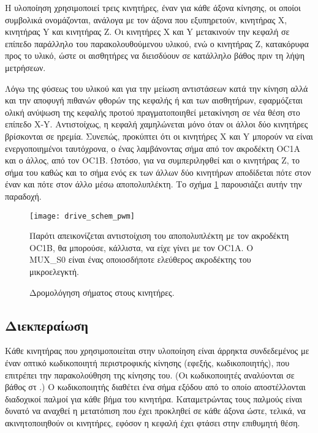 Η υλοποίηση χρησιμοποιεί τρεις κινητήρες, έναν για κάθε άξονα κίνησης, οι οποίοι
συμβολικά ονομάζονται, ανάλογα με τον άξονα που εξυπηρετούν, κινητήρας X,
κινητήρας Y και κινητήρας Z. Οι κινητήρες X και Y μετακινούν την κεφαλή σε
επίπεδο παράλληλο του παρακολουθούμενου υλικού, ενώ ο κινητήρας Z, κατακόρυφα
προς το υλικό, ώστε οι αισθητήρες να διεισδύουν σε κατάλληλο βάθος πριν τη λήψη
μετρήσεων.

Λόγω της φύσεως του υλικού και για την μείωση αντιστάσεων κατά την κίνηση αλλά
και την αποφυγή πιθανών φθορών της κεφαλής ή και των αισθητήρων, εφαρμόζεται
ολική ανύψωση της κεφαλής προτού πραγματοποιηθεί μετακίνηση σε νέα θέση στο
επίπεδο X-Y. Αντιστοίχως, η κεφαλή χαμηλώνεται μόνο όταν οι άλλοι δύο κινητήρες
βρίσκονται σε ηρεμία. Συνεπώς, προκύπτει ότι οι κινητήρες X και Y μπορούν να
είναι ενεργοποιημένοι ταυτόχρονα, ο ένας λαμβάνοντας σήμα από τον ακροδέκτη OC1A
και ο άλλος, από τον OC1B. Ωστόσο, για να συμπεριληφθεί και ο κινητήρας Z, το
σήμα του καθώς και το σήμα ενός εκ των άλλων δύο κινητήρων αποδίδεται πότε στον
έναν και πότε στον άλλο μέσω αποπολυπλέκτη. Το σχήμα
\ref{fig:motor:route_pwm} παρουσιάζει αυτήν την παραδοχή.

\begin{figure}
    \caption{Δρομολόγηση σήματος στους κινητήρες.
    \label{fig:motor:route_pwm}}
    \begin{center}
    \texttt{[image: drive\_schem\_pwm]}
    \end{center}
Παρότι απεικονίζεται αντιστοίχιση του αποπολυπλέκτη με τον ακροδέκτη OC1B, θα
μπορούσε, κάλλιστα, να είχε γίνει με τον OC1A. Ο MUX\_S0 είναι ένας οποιοσδήποτε
ελεύθερος ακροδέκτης του μικροελεγκτή.
\end{figure}


\subsection{Διεκπεραίωση}

Κάθε κινητήρας που χρησιμοποιείται στην υλοποίηση είναι άρρηκτα συνδεδεμένος με
έναν οπτικό κωδικοποιητή περιστροφικής κίνησης (εφεξής, κωδικοποιητής), που
επιτρέπει την παρακολούθηση της κίνησης του. (Οι κωδικοποιητές αναλύονται σε
βάθος στ \nref.)
Ο κωδικοποιητής διαθέτει ένα σήμα εξόδου από το οποίο αποστέλλονται διαδοχικοί
παλμοί για κάθε βήμα του κινητήρα. Καταμετρώντας τους παλμούς είναι δυνατό να
αναχθεί η μετατόπιση που έχει προκληθεί σε κάθε άξονα ώστε, τελικά, να
ακινητοποιηθούν οι κινητήρες, εφόσον η κεφαλή έχει φτάσει στην επιθυμητή θέση.

